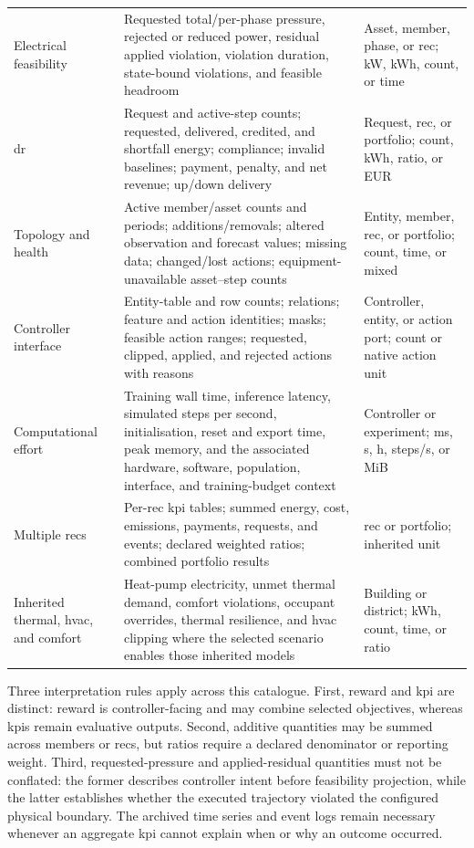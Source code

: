 {\begin{longtable}{@{}p{}p{}p{}@{}}
Electrical feasibility & Requested total/per-phase pressure, rejected or reduced power, residual applied violation, violation duration, state-bound violations, and feasible headroom & Asset, member, phase, or \gls{rec}; kW, kWh, count, or time \\
\gls{dr} & Request and active-step counts; requested, delivered, credited, and shortfall energy; compliance; invalid baselines; payment, penalty, and net revenue; up/down delivery & Request, \gls{rec}, or portfolio; count, kWh, ratio, or EUR \\
Topology and health & Active member/asset counts and periods; additions/removals; altered observation and forecast values; missing data; changed/lost actions; equipment-unavailable asset--step counts & Entity, member, \gls{rec}, or portfolio; count, time, or mixed \\
Controller interface & Entity-table and row counts; relations; feature and action identities; masks; feasible action ranges; requested, clipped, applied, and rejected actions with reasons & Controller, entity, or action port; count or native action unit \\
Computational effort & Training wall time, inference latency, simulated steps per second, initialisation, reset and export time, peak memory, and the associated hardware, software, population, interface, and training-budget context & Controller or experiment; ms, s, h, steps/s, or MiB \\
Multiple \glspl{rec} & Per-\gls{rec} \gls{kpi} tables; summed energy, cost, emissions, payments, requests, and events; declared weighted ratios; combined portfolio results & \gls{rec} or portfolio; inherited unit \\
Inherited thermal, \gls{hvac}, and comfort & Heat-pump electricity, unmet thermal demand, comfort violations, occupant overrides, thermal resilience, and \gls{hvac} clipping where the selected scenario enables those inherited models & Building or district; kWh, count, time, or ratio \\
\bottomrule
\end{longtable}
}

Three interpretation rules apply across this catalogue. First, reward and \gls{kpi} are distinct: reward is controller-facing and may combine selected objectives, whereas \glspl{kpi} remain evaluative outputs. Second, additive quantities may be summed across members or \glspl{rec}, but ratios require a declared denominator or reporting weight. Third, requested-pressure and applied-residual quantities must not be conflated: the former describes controller intent before feasibility projection, while the latter establishes whether the executed trajectory violated the configured physical boundary. The archived time series and event logs remain necessary whenever an aggregate \gls{kpi} cannot explain when or why an outcome occurred.

